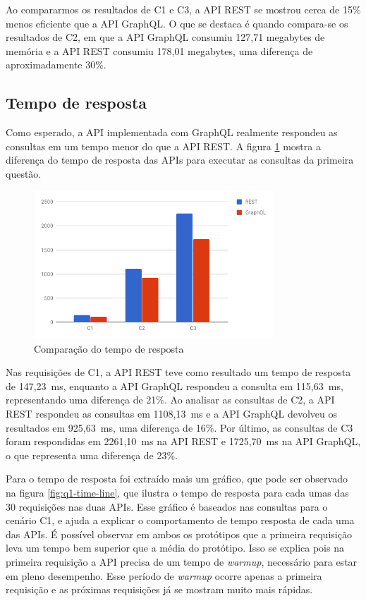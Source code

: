 Ao compararmos os resultados de C1 e C3, a API REST se mostrou cerca de 15\% menos eficiente que a API GraphQL. O que se destaca é quando compara-se os resultados de C2, em que a API GraphQL consumiu 127,71 megabytes de memória e a API REST consumiu 178,01 megabytes, uma diferença de aproximadamente 30\%.

\subsection{Tempo de resposta}

Como esperado, a API implementada com GraphQL realmente respondeu as consultas em um tempo menor do que a API REST. A figura \ref{fig:q1-time} mostra a diferença do tempo de resposta das APIs para executar as consultas da primeira questão.

\begin{figure}[htbp]
    \centering
    \includegraphics[width=0.8\textwidth]{figuras/q1-time.png}
    \caption{Comparação do tempo de resposta}
    \label{fig:q1-time}
    \author{fonte: Autor}
\end{figure}

Nas requisições de C1, a API REST teve como resultado um tempo de resposta de 147,23~ms, enquanto a API GraphQL respondeu a consulta em 115,63~ms, representando uma diferença de 21\%. Ao analisar as consultas de C2, a API REST respondeu as consultas em 1108,13~ms e a API GraphQL devolveu os resultados em 925,63~ms, uma diferença de 16\%. Por último, as consultas de C3 foram respondidas em 2261,10~ms na API REST e 1725,70~ms na API GraphQL, o que representa uma diferença de 23\%.

Para o tempo de resposta foi extraído mais um gráfico, que pode ser observado na figura \ref{fig:q1-time-line}, que ilustra o tempo de resposta para cada umas das 30 requisições nas duas APIs. Esse gráfico é baseados nas consultas para o cenário C1, e ajuda a explicar o comportamento de tempo resposta de cada uma das APIs. É possível observar em ambos os protótipos que a primeira requisição leva um tempo bem superior que a média do protótipo. Isso se explica pois na primeira requisição a API precisa de um tempo de \textit{warmup}, necessário para estar em pleno desempenho. Esse período de \textit{warmup} ocorre apenas a primeira requisição e as próximas requisições já se mostram muito mais rápidas.

